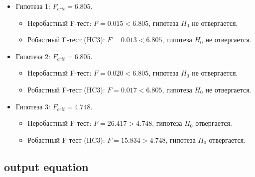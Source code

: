 \documentclass[
  russian,
]{article}
\providecommand{\tightlist}{%
  \setlength{\itemsep}{0pt}\setlength{\parskip}{0pt}}
\begin{document}
\begin{tcolorbox}[enhanced jigsaw, arc=.35mm, bottomrule=.15mm, bottomtitle=1mm, breakable, colback=white, colbacktitle=quarto-callout-tip-color!10!white, colframe=quarto-callout-tip-color-frame, coltitle=black, left=2mm, leftrule=.75mm, opacityback=0, opacitybacktitle=0.6, rightrule=.15mm, title=\textcolor{quarto-callout-tip-color}{\faLightbulb}\hspace{0.5em}{Критические значения и выводы}, titlerule=0mm, toprule=.15mm, toptitle=1mm]

\begin{itemize}
\tightlist
\item
  Гипотеза 1: \(F_{crit} = 6.805\).

  \begin{itemize}
  \tightlist
  \item
    Неробастный F-тест: \(F = 0.015 < 6.805\), гипотеза \(H_0\) не
    отвергается.
  \item
    Робастный F-тест (HC3): \(F = 0.013 < 6.805\), гипотеза \(H_0\) не
    отвергается.
  \end{itemize}
\item
  Гипотеза 2: \(F_{crit} = 6.805\).

  \begin{itemize}
  \tightlist
  \item
    Неробастный F-тест: \(F = 0.020 < 6.805\), гипотеза \(H_0\) не
    отвергается.
  \item
    Робастный F-тест (HC3): \(F = 0.017 < 6.805\), гипотеза \(H_0\) не
    отвергается.
  \end{itemize}
\item
  Гипотеза 3: \(F_{crit} = 4.748\).

  \begin{itemize}
  \tightlist
  \item
    Неробастный F-тест: \(F = 26.417 > 4.748\), гипотеза \(H_0\)
    отвергается.
  \item
    Робастный F-тест (HC3): \(F = 15.834 > 4.748\), гипотеза \(H_0\)
    отвергается.
  \end{itemize}
\end{itemize}

\end{tcolorbox}

\subsection{output equation}\label{output-equation}
\end{document}
